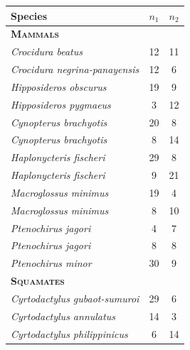
\begin{frame}
\begin{columns}[c]
        \begin{table}%
            \scriptsize
            \addtolength{\tabcolsep}{-0.09cm}
            \centering
            \begin{tabular}{ l c c }
                \textbf{Species} & {\boldmath $n_1$} & {\boldmath $n_2$} \\
                \hline
                \textbf{\textsc{Mammals}} & & \\
                \emph{Crocidura beatus}             & 12 & 11 \\
                \emph{Crocidura negrina-panayensis} & 12 & 6  \\
                \emph{Hipposideros obscurus}        & 19 & 9  \\
                \emph{Hipposideros pygmaeus}        & 3  & 12 \\
                \emph{Cynopterus brachyotis}        & 20 & 8  \\
                \emph{Cynopterus brachyotis}        & 8  & 14 \\
                \emph{Haplonycteris fischeri}       & 29 & 8  \\
                \emph{Haplonycteris fischeri}       & 9  & 21 \\
                \emph{Macroglossus minimus}         & 19 & 4  \\
                \emph{Macroglossus minimus}         & 8  & 10 \\
                \emph{Ptenochirus jagori}           & 4  & 7  \\
                \emph{Ptenochirus jagori}           & 8  & 8  \\
                \emph{Ptenochirus minor}            & 30 & 9  \\
                \textbf{\textsc{Squamates}} & & \\
                \emph{Cyrtodactylus gubaot-sumuroi} & 29 & 6  \\
                \emph{Cyrtodactylus annulatus}      & 14 & 3  \\
                \emph{Cyrtodactylus philippinicus}  & 6  & 14 \\

\end{tabular}
\end{table}
\end{columns}
\end{frame}
